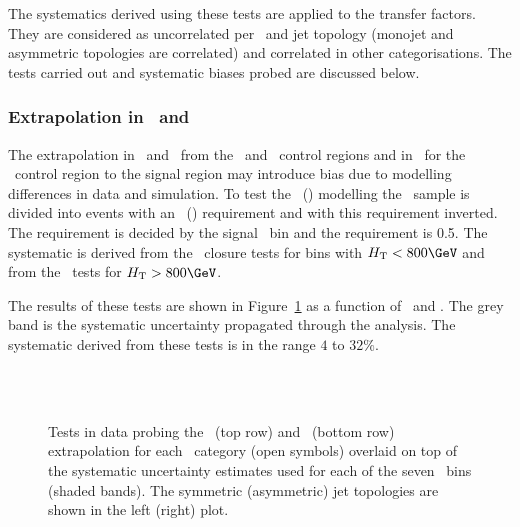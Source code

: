 The systematics derived using these tests are applied to the transfer factors. They are considered
as uncorrelated per \scalht~and jet topology (monojet and asymmetric topologies are correlated) and correlated in other categorisations. The tests carried 
out and systematic biases probed are discussed below.

\subsubsection{Extrapolation in \alphat~and \bdphi}

The extrapolation in \alphat~and \bdphi~from the \mj~and \mmj~control regions 
and in \bdphi~for the \gj~control region to the signal region may introduce bias
 due to modelling differences in data and simulation. To test the \alphat~(\bdphi) modelling the \mj~sample is divided 
into events with an \alphat~(\bdphi) requirement and with this requirement inverted.
The \alphat requirement is decided by the signal \scalht~bin 
and the \bdphi requirement is 0.5. The systematic is derived from the \alphat~closure tests for
bins with $\scalht < 800 \GeV$ and from the \bdphi~tests for $\scalht > 800 \GeV$.

The results of these tests are shown in Figure~\ref{fig:closureAlphaT} as a function of \scalht~and \njet. 
The grey band is the systematic uncertainty propagated through the analysis. 
The systematic derived from these tests is
in the range $4$ to $32\%$.

\begin{figure}[h!]
  \begin{center}
    ~~
    \\
    ~~

    \caption{Tests in data probing the \alphat~(top row) and \bdphi~(bottom row) extrapolation for each
      \njet~category (open symbols) overlaid on top of the systematic
      uncertainty estimates used for each of the seven \scalht~bins (shaded bands). 
      The symmetric (asymmetric) jet topologies are shown in the left (right) plot. 
    }
    \label{fig:closureAlphaT}
  \end{center} 
\end{figure}
